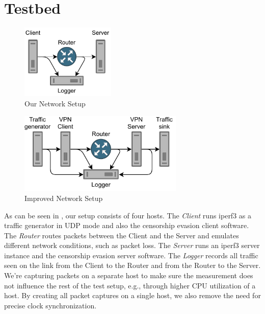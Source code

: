 \section{Testbed}
\begin{figure}[tbh]
	\centering
	\includegraphics[draft=false,width=0.4\textwidth]{figures/Network schematic/actual/setup.pdf}
	\caption{Our Network Setup}
	\label{fig:actual_network_schematic}
\end{figure}
\begin{figure}[tbh]
	\centering
	\includegraphics[draft=false,width=0.7\textwidth]{figures/Network schematic/optimal/setup.pdf}
	\caption{Improved Network Setup}
	\label{fig:optimal_network_schematic}
\end{figure}

As can be seen in , our setup consists of four hosts.
The \textit{Client} runs iperf3 as a traffic generator in UDP mode and also the censorship evasion client software.
The \textit{Router} routes packets between the Client and the Server and emulates different network conditions, such as packet loss.
The \textit{Server} runs an iperf3 server instance and the censorship evasion server software.
The \textit{Logger} records all traffic seen on the link from the Client to the Router and from the Router to the Server.
We're capturing packets on a separate host to make sure the measurement does not influence the rest of the test setup, e.g., through higher CPU utilization of a host.
By creating all packet captures on a single host, we also remove the need for precise clock synchronization.

